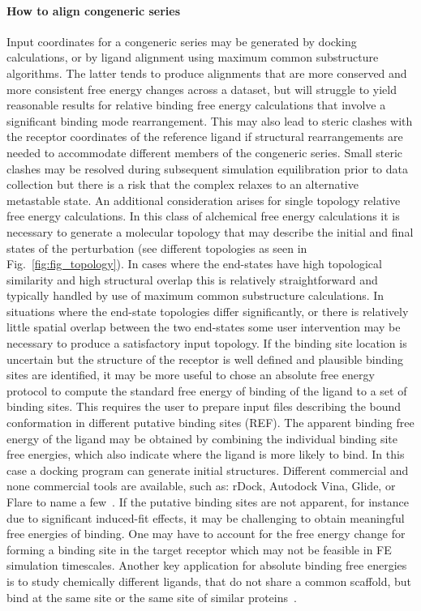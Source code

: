 \documentclass[9pt,bestpractices]{livecoms}
\begin{document}
\paragraph{How to align congeneric series}
Input coordinates for a congeneric series may be generated by docking calculations, or by ligand alignment using maximum common substructure algorithms. The latter tends to produce alignments that are more conserved and more consistent free energy changes across a dataset, but will struggle to yield reasonable results for relative binding free energy calculations that involve a significant binding mode rearrangement. This may also lead to steric clashes with the receptor coordinates of the reference ligand if structural rearrangements are needed to accommodate different members of the congeneric series. Small steric clashes may be resolved during subsequent simulation equilibration prior to data collection but there is a risk that the complex relaxes to an alternative metastable state. 
%
An additional consideration arises for single topology relative free energy calculations. In this class of alchemical free energy calculations it is necessary to generate a molecular topology that may describe the initial and final states of the perturbation (see different topologies as seen in Fig.~\ref{fig:fig_topology}). In cases where the end-states have high topological similarity and high structural overlap this is relatively straightforward and typically handled by use of maximum common substructure calculations. In situations where the end-state topologies differ significantly, or there is relatively little spatial overlap between the two end-states some user intervention may be necessary to produce a satisfactory input topology.
%
If the binding site location is uncertain but the structure of the receptor is well defined and plausible binding sites are identified, it may be more useful to chose an absolute free energy protocol to compute the standard free energy of binding of the ligand to a set of binding sites. This requires the user to prepare input files describing the bound conformation in different putative binding sites (REF). The apparent binding free energy of the ligand may be obtained by combining the individual binding site free energies, which also indicate where the ligand is more likely to bind. In this case a docking program can generate initial structures. Different commercial and none commercial tools are available, such as: rDock, Autodock Vina, Glide, or Flare to name a few~\cite{ruiz-carmona2014rdock, trott2010autodock, friesner2004glide, cheeseright2006molecular}. 
If the putative binding sites are not apparent, for instance due to significant induced-fit effects, it may be challenging to obtain meaningful free energies of binding. One may have to account for the free energy change for forming a binding site in the target receptor which may not be feasible in FE simulation timescales. Another key application for absolute binding free energies is to study chemically different ligands, that do not share a common scaffold, but bind at the same site or the same site of similar proteins~\cite{aldeghi2015accurate}.  
%
\end{document}
